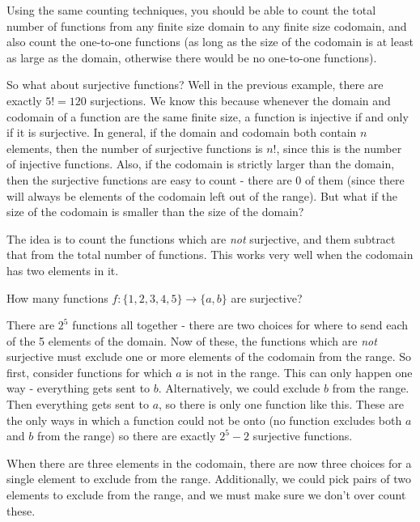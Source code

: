 \documentclass[12pt]{article}
\begin{document}
Using the same counting techniques, you should be able to count the total number of functions from any finite size domain to any finite size codomain, and also count the one-to-one functions (as long as the size of the codomain is at least as large as the domain, otherwise there would be no one-to-one functions).

So what about surjective functions?  Well in the previous example, there are exactly $5! = 120$ surjections.  We know this because whenever the domain and codomain of a function are the same finite size, a function is injective if and only if it is surjective.  In general, if the domain and codomain both contain $n$ elements, then the number of surjective functions is $n!$, since this is the number of injective functions.  Also, if the codomain is strictly larger than the domain, then the surjective functions are easy to count - there are 0 of them (since there will always be elements of the codomain left out of the range).  But what if the size of the codomain is smaller than the size of the domain?

The idea is to count the functions which are {\em not} surjective, and them subtract that from the total number of functions.  This works very well when the codomain has two elements in it.

\begin{example}
  How many functions $f: \{1,2,3,4,5\} \to \{a,b\}$ are surjective?
  \begin{solution}
    There are $2^5$ functions all together - there are two choices for where to send each of the 5 elements of the domain.  Now of these, the functions which are {\em not} surjective must exclude one or more elements of the codomain from the range.  So first, consider functions for which $a$ is not in the range.  This can only happen one way - everything gets sent to $b$.  Alternatively, we could exclude $b$ from the range.  Then everything gets sent to $a$, so there is only one function like this.  These are the only ways in which a function could not be onto (no function excludes both $a$ and $b$ from the range) so there are exactly $2^5 - 2$ surjective functions.
  \end{solution}
\end{example}

When there are three elements in the codomain, there are now three choices for a single element to exclude from the range.  Additionally, we could pick pairs of two elements to exclude from the range, and we must make sure we don't over count these.
\end{document}
